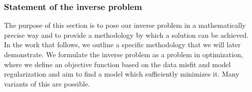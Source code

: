 \documentclass[preprint,review,3p,times,onecolumn,authoryear]{elsarticle}
\begin{document}

\subsubsection*{Statement of the inverse problem}

The purpose of this section is to pose our inverse problem in a mathematically precise
way and to provide a methodology by which a solution can be achieved. In the work that
follows, we outline a specific methodology that we will later demonstrate.
We formulate the inverse problem as a problem in optimization, where we define an objective function based on the data misfit and model regularization and aim to find a model which sufficiently minimizes it. Many variants
of this are possible.
\end{document}
